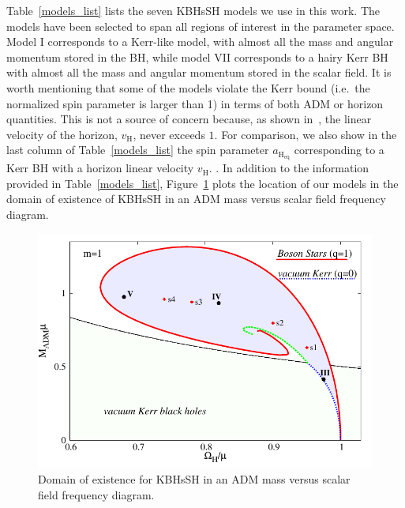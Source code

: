\documentclass[twocolumn,aps,showpacs,showkeys,prd,superscriptaddress,byrevtex, amsmath]{revtex4-1}
\begin{document}
Table~\ref{models_list} lists the seven KBHsSH models we use in this work. The models have been selected to span all regions of interest in the parameter space. Model I corresponds to a Kerr-like model, with almost all the mass and angular momentum stored in the BH, while model VII corresponds to a hairy Kerr BH with almost all the mass and angular momentum stored in the scalar field. It is worth mentioning that some of the models violate the Kerr bound (i.e.~the normalized spin parameter is larger than 1) in terms of both ADM or horizon quantities. This is not a source of concern because, as shown in~\cite{Herdeiro:2015c}, the linear velocity of the horizon, $v_{\mathrm{H}}$, never exceeds $1$. For comparison, we also show in the last column of Table~\ref{models_list} the spin parameter $a_{\mathrm{H_{eq}}}$ corresponding to a Kerr BH with a horizon linear velocity $v_{\mathrm{H}}$. . In addition to the information provided in Table~\ref{models_list}, Figure~\ref{existence} plots the location of our models in  the domain of existence of KBHsSH in an ADM mass versus scalar field frequency diagram.  


\begin{figure}
\centering
\includegraphics[scale=0.7]{figures/existence-eps-converted-to.pdf}
\caption{Domain of existence for KBHsSH in an ADM mass versus scalar
field frequency diagram. }
\label{existence}
\end{figure}
\end{document}
